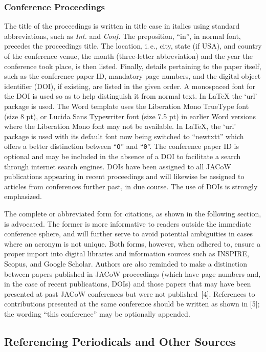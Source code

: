 \subsubsection{Conference Proceedings} The title of the proceedings is
written in title case in italics using standard abbreviations,
such as \emph{Int.} and \emph{Conf.} The preposition, ``in'', in normal
font, precedes the proceedings title. The location,
i.\,e., city, state (if USA), and country of the conference
venue, the month (three-letter abbreviation) and the year
the conference took place, is then listed. Finally, details
pertaining to the paper itself, such as the conference paper
ID, mandatory page numbers, and the digital object
identifier (DOI), if existing, are listed in the given order.
A monospaced font for the DOI is used so as to help
distinguish it from normal text. In \LaTeX{}
the ‘url’ package is used. The Word template uses the Liberation
Mono TrueType font (size 8 pt), or Lucida Sans Typewriter
font (size 7.5 pt) in earlier Word versions where the Liberation
Mono font may not be available. In LaTeX, the ‘url’
package is used with its default font now being switched to 
``newtxtt'' which offers a better distinction between 
``\texttt{O}'' and ``\texttt{0}''. The conference
paper ID is optional and may be included in the absence
of a DOI to facilitate a search through internet search
engines. DOIs have been assigned to all JACoW
publications appearing in recent proceedings and will
likewise be assigned to articles from conferences further
past, in due course. The use of DOIs is strongly
emphasized.

The complete or abbreviated form for citations, as
shown in the following section, is advocated. The former
is more informative to readers outside the immediate
conference sphere, and will further serve to avoid
potential ambiguities in cases where an acronym is not
unique. Both forms, however, when adhered to, ensure a
proper import into digital libraries and information
sources such as INSPIRE, Scopus, and Google Scholar.
Authors are also reminded to make a distinction between
papers published in JACoW proceedings (which have
page numbers and, in the case of recent publications,
DOIs) and those papers that may have been presented at
past JACoW conferences but were not published~[4].
References to contributions presented at the same
conference should be written as shown in [5]; the wording
“this conference” may be optionally appended.

\subsection{Referencing Periodicals and Other Sources}

